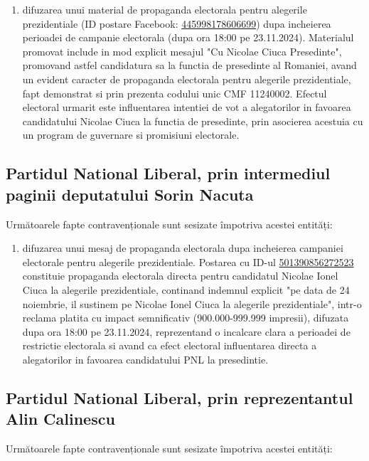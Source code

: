 \documentclass[a4paper,12pt]{article}
\begin{document}
\begin{enumerate}[leftmargin=*, label=\arabic*.)]
    \item difuzarea unui material de propaganda electorala pentru alegerile prezidentiale (ID postare Facebook: \href{https://www.facebook.com/ads/library/?id=445998178606699}{445998178606699}) dupa incheierea perioadei de campanie electorala (dupa ora 18:00 pe 23.11.2024). Materialul promovat include in mod explicit mesajul "Cu Nicolae Ciuca Presedinte", promovand astfel candidatura sa la functia de presedinte al Romaniei, avand un evident caracter de propaganda electorala pentru alegerile prezidentiale, fapt demonstrat si prin prezenta codului unic CMF 11240002. Efectul electoral urmarit este influentarea intentiei de vot a alegatorilor in favoarea candidatului Nicolae Ciuca la functia de presedinte, prin asocierea acestuia cu un program de guvernare si promisiuni electorale.
\end{enumerate}

\vspace{0.5cm}

\subsection{Partidul National Liberal, prin intermediul paginii deputatului Sorin Nacuta}
Următoarele fapte contravenționale sunt sesizate împotriva acestei entități:

\begin{enumerate}[leftmargin=*, label=\arabic*.)]
    \item difuzarea unui mesaj de propaganda electorala dupa incheierea campaniei electorale pentru alegerile prezidentiale. Postarea cu ID-ul \href{https://www.facebook.com/ads/library/?id=501390856272523}{501390856272523} constituie propaganda electorala directa pentru candidatul Nicolae Ionel Ciuca la alegerile prezidentiale, continand indemnul explicit "pe data de 24 noiembrie, il sustinem pe Nicolae Ionel Ciuca la alegerile prezidentiale", intr-o reclama platita cu impact semnificativ (900.000-999.999 impresii), difuzata dupa ora 18:00 pe 23.11.2024, reprezentand o incalcare clara a perioadei de restrictie electorala si avand ca efect electoral influentarea directa a alegatorilor in favoarea candidatului PNL la presedintie.
\end{enumerate}

\vspace{0.5cm}

\subsection{Partidul National Liberal, prin reprezentantul Alin Calinescu}
Următoarele fapte contravenționale sunt sesizate împotriva acestei entități:
\end{document}
